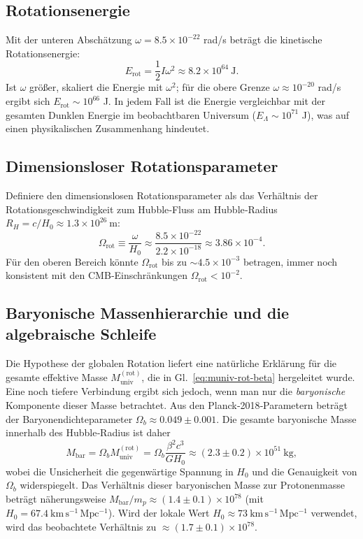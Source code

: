 \documentclass[11pt,a4paper]{article}
\newcommand{\Omegarot}{\Omega_{\mathrm{rot}}}
\begin{document}
	\subsection{Rotationsenergie}
	
	Mit der unteren Abschätzung \(\omega = 8.5\times10^{-22}\) rad/s beträgt die kinetische Rotationsenergie:
	\begin{equation}
		E_{\text{rot}} = \frac{1}{2} I \omega^2 \approx 8.2 \times 10^{64}\ \text{J}.
	\end{equation}
	Ist \(\omega\) größer, skaliert die Energie mit \(\omega^2\); für die obere Grenze \(\omega \approx 10^{-20}\) rad/s ergibt sich \(E_{\text{rot}} \sim 10^{66}\) J. In jedem Fall ist die Energie vergleichbar mit der gesamten Dunklen Energie im beobachtbaren Universum (\(E_{\Lambda} \sim 10^{71}\) J), was auf einen physikalischen Zusammenhang hindeutet.
	
	\subsection{Dimensionsloser Rotationsparameter}
	
	Definiere den dimensionslosen Rotationsparameter als das Verhältnis der Rotationsgeschwindigkeit zum Hubble‑Fluss am Hubble‑Radius \(R_H = c/H_0 \approx 1.3\times10^{26}\ \text{m}\):
	\begin{equation}
		\Omegarot \equiv \frac{\omega}{H_0} \approx \frac{8.5\times10^{-22}}{2.2\times10^{-18}} \approx 3.86\times10^{-4}.
	\end{equation}
	Für den oberen Bereich könnte \(\Omegarot\) bis zu \(\sim 4.5\times10^{-3}\) betragen, immer noch konsistent mit den CMB‑Einschränkungen \(\Omegarot < 10^{-2}\).
	
	\subsection{Baryonische Massenhierarchie und die algebraische Schleife}
	\label{subsec:baryon-hierarchy}
	
	Die Hypothese der globalen Rotation liefert eine natürliche Erklärung für die gesamte effektive Masse \(M_{\mathrm{univ}}^{\mathrm{(rot)}}\), die in Gl.~\eqref{eq:muniv-rot-beta} hergeleitet wurde. Eine noch tiefere Verbindung ergibt sich jedoch, wenn man nur die \emph{baryonische} Komponente dieser Masse betrachtet. Aus den Planck‑2018‑Parametern beträgt der Baryonendichteparameter \(\Omega_b \approx 0.049 \pm 0.001\). Die gesamte baryonische Masse innerhalb des Hubble‑Radius ist daher
	\begin{equation}
		M_{\mathrm{bar}} = \Omega_b M_{\mathrm{univ}}^{\mathrm{(rot)}} = \Omega_b \frac{\beta^2 c^3}{G H_0} \approx (2.3 \pm 0.2) \times 10^{51}\ \mathrm{kg},
	\end{equation}
	wobei die Unsicherheit die gegenwärtige Spannung in \(H_0\) und die Genauigkeit von \(\Omega_b\) widerspiegelt. Das Verhältnis dieser baryonischen Masse zur Protonenmasse beträgt näherungsweise \(M_{\mathrm{bar}}/m_p \approx (1.4 \pm 0.1) \times 10^{78}\) (mit \(H_0 = 67.4\ \mathrm{km\,s^{-1}\,Mpc^{-1}}\)). Wird der lokale Wert \(H_0 \approx 73\ \mathrm{km\,s^{-1}\,Mpc^{-1}}\) verwendet, wird das beobachtete Verhältnis zu \(\approx (1.7 \pm 0.1) \times 10^{78}\).
	
\end{document}
